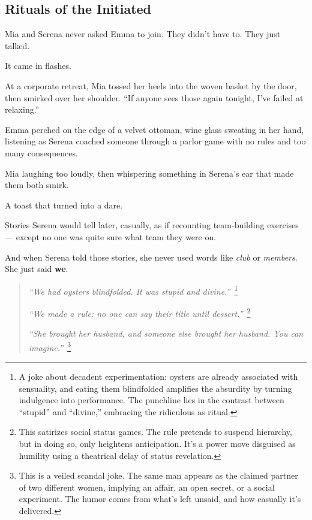 
\subsection{Rituals of the Initiated}

Mia and Serena never asked Emma to join.  
They didn’t have to.  
They just talked.

It came in flashes.

At a corporate retreat, Mia tossed her heels into the woven basket by the door, then smirked over her 
shoulder. ``If anyone sees those again tonight, I’ve failed at relaxing.''

Emma perched on the edge of a velvet ottoman, wine glass sweating in her hand, listening as Serena 
coached someone through a parlor game with no rules and too many consequences.

Mia laughing too loudly, then whispering something in Serena’s ear that made them both smirk.

A toast that turned into a dare.

Stories Serena would tell later, casually, as if recounting team-building exercises --- except no one 
was quite sure what team they were on.

And when Serena told those stories, she never used words like \textit{club} or \textit{members}.
She just said \textbf{we}.

\begin{quote}
  \textit{``We had oysters blindfolded. It was stupid and divine.''}\ \footnote{A joke about decadent 
  experimentation: oysters are already associated with sensuality, and eating them blindfolded amplifies 
  the absurdity by turning indulgence into performance. The punchline lies in the contrast between 
  “stupid” and “divine,” embracing the ridiculous as ritual.}

  \textit{``We made a rule: no one can say their title until dessert.''}\ \footnote{This satirizes social status 
  games. The rule pretends to suspend hierarchy, but in doing so, only heightens anticipation. It’s a power 
  move disguised as humility using a theatrical delay of status revelation.}

  \textit{``She brought her husband, and someone else brought her husband. You can imagine.''}\ \footnote{This 
  is a veiled scandal joke. The same man appears as the claimed partner of two different women, implying 
  an affair, an open secret, or a social experiment. The humor comes from what’s left unsaid, and 
  how casually it's delivered.}
\end{quote}

